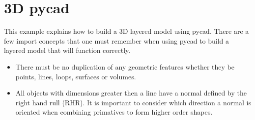 
%
%
%

\section{3D pycad}

This example explains how to build a 3D layered model using pycad. There are a
few import concepts that one must remember when using pycad to build a layered
model that will function correctly.
\begin{itemize}
  \item There must be no duplication of any geometric features whether they be
  points, lines, loops, surfaces or volumes.
  \item All objects with dimensions greater then a line have a normal defined by
  the right hand rull (RHR). It is important to consider which direction a
  normal is oriented when combining primatives to form higher order shapes.
\end{itemize}

